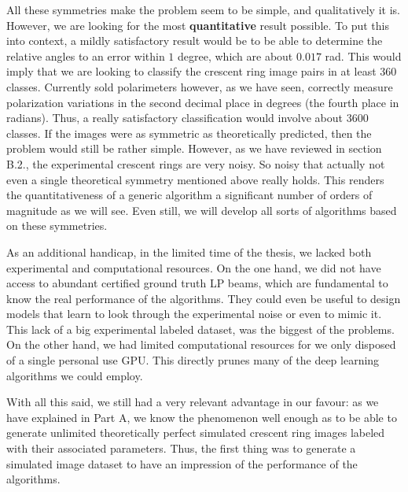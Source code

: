 \documentclass[11pt, a4paper, twoside]{article} %
\begin{document}

All these symmetries make the problem seem to be simple, and qualitatively it is. However, we are looking for the most {\bf quantitative} result possible. To put this into context, a mildly satisfactory result would be to be able to determine the relative angles to an error within $1$ degree, which are about $0.017$ rad. This would imply that we are looking to classify the crescent ring image pairs in at least 360 classes. Currently sold polarimeters however, as we have seen, correctly measure polarization variations in the second decimal place in degrees (the fourth place in radians). Thus, a really satisfactory classification would involve about 3600 classes. If the images were as symmetric as theoretically predicted, then the problem would still be rather simple. However, as we have reviewed in section B.2., the experimental crescent rings are very noisy. So noisy that actually not even a single theoretical symmetry mentioned above really holds. This renders the quantitativeness of a generic algorithm a significant number of orders of magnitude as we will see. Even still, we will develop all sorts of algorithms based on these symmetries.

As an additional handicap, in the limited time of the thesis, we lacked both experimental and computational resources. On the one hand, we did not have access to abundant certified ground truth LP beams, which are fundamental to know the real performance of the algorithms. They could even be useful to design models that learn to look through the experimental noise or even to mimic it. This lack of a big experimental labeled dataset, was the biggest of the problems. On the other hand, we had limited computational resources for we only disposed of a single personal use GPU. This directly prunes many of the deep learning algorithms we could employ.


With all this said, we still had a very relevant advantage in our favour: as we have explained in Part A, we know the phenomenon well enough as to be able to generate unlimited theoretically perfect simulated crescent ring images labeled with their associated parameters. Thus, the first thing was to generate a simulated image dataset to have an impression of the performance of the algorithms.
\vspace{-0.3cm}
\end{document}

